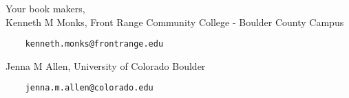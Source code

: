 \noindent Your book makers, \\
	Kenneth M Monks, Front Range Community College - Boulder County Campus 
	\begin{verbatim}
    kenneth.monks@frontrange.edu
    \end{verbatim}
	Jenna M Allen, University of Colorado Boulder 
	\begin{verbatim}
    jenna.m.allen@colorado.edu
    \end{verbatim}

\clearpage